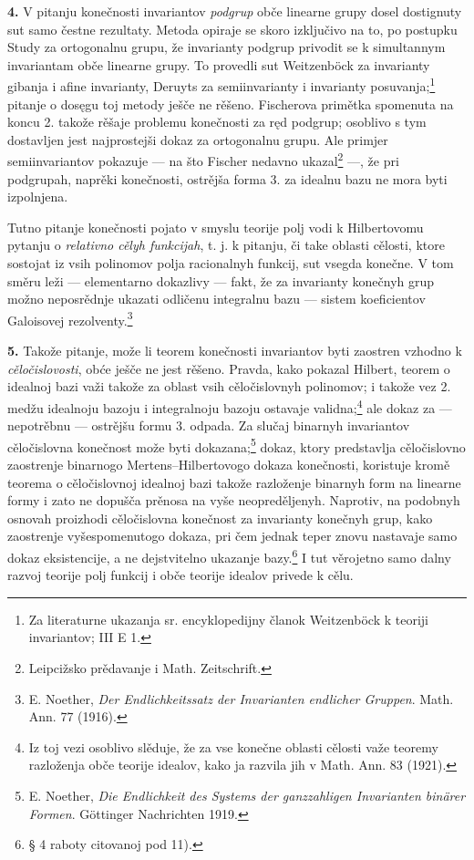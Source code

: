 \documentclass[11pt]{article}
\begin{document}
\textbf{4.} V pitanju konečnosti invariantov \emph{podgrup} obče linearne grupy dosel dostignuty sut samo čestne rezultaty. Metoda opiraje se skoro izključivo na to, po postupku Study za ortogonalnu grupu, že invarianty podgrup privodit se k simultannym invariantam obče linearne grupy. To provedli sut Weitzenböck za invarianty gibanja i afine invarianty, Deruyts za semiinvarianty i invarianty posuvanja;\footnote{Za literaturne ukazanja sr. encyklopedijny članok Weitzenböck k teoriji invariantov; III E 1.} pitanje o dosęgu toj metody ješče ne rěšeno. Fischerova primětka spomenuta na koncu 2. takože rěšaje problemu konečnosti za ręd podgrup; osoblivo s tym dostavljen jest najprostejši dokaz za ortogonalnu grupu. Ale primjer semiinvariantov pokazuje --- na što Fischer nedavno ukazal\footnote{Leipcižsko prědavanje i Math. Zeitschrift.} ---, že pri podgrupah, naprěki konečnosti, ostrějša forma 3. za idealnu bazu ne mora byti izpolnjena.

Tutno pitanje konečnosti pojato v smyslu teorije polj vodi k Hilbertovomu pytanju o \emph{relativno cělyh funkcijah}, t. j. k pitanju, či take oblasti cělosti, ktore sostojat iz vsih polinomov polja racionalnyh funkcij, sut vsegda konečne. V tom směru leži --- elementarno dokazlivy --- fakt, že za invarianty konečnyh grup možno neposrědnje ukazati odličenu integralnu bazu --- sistem koeficientov Galoisovej rezolventy.\footnote{E. Noether, \emph{Der Endlichkeitssatz der Invarianten endlicher Gruppen}. Math. Ann. 77 (1916).}

\textbf{5.} Takože pitanje, može li teorem konečnosti invariantov byti zaostren vzhodno k \emph{cěločislovosti}, obće ješče ne jest rěšeno. Pravda, kako pokazal Hilbert, teorem o idealnoj bazi važi takože za oblast vsih cěločislovnyh polinomov; i takože vez 2. medžu idealnoju bazoju i integralnoju bazoju ostavaje validna;\footnote{Iz toj vezi osoblivo slěduje, že za vse konečne oblasti cělosti važe teoremy razloženja obče teorije idealov, kako ja razvila jih v Math. Ann. 83 (1921).} ale dokaz za --- nepotrěbnu --- ostrějšu formu 3. odpada. Za slučaj binarnyh invariantov cěločislovna konečnost može byti dokazana;\footnote{E. Noether, \emph{Die Endlichkeit des Systems der ganzzahligen Invarianten binärer Formen}. Göttinger Nachrichten 1919.} dokaz, ktory predstavlja cěločislovno zaostrenje binarnogo Mertens--Hilbertovogo dokaza konečnosti, koristuje kromě teorema o cěločislovnoj idealnoj bazi takože razloženje binarnyh form na linearne formy i zato ne dopušča prěnosa na vyše neopreděljenyh. Naprotiv, na podobnyh osnovah proizhodi cěločislovna konečnost za invarianty konečnyh grup, kako zaostrenje vyšespomenutogo dokaza, pri čem jednak teper znovu nastavaje samo dokaz eksistencije, a ne dejstvitelno ukazanje bazy.\footnote{§ 4 raboty citovanoj pod 11).} I tut věrojetno samo dalny razvoj teorije polj funkcij i obče teorije idealov privede k cělu.
\end{document}
